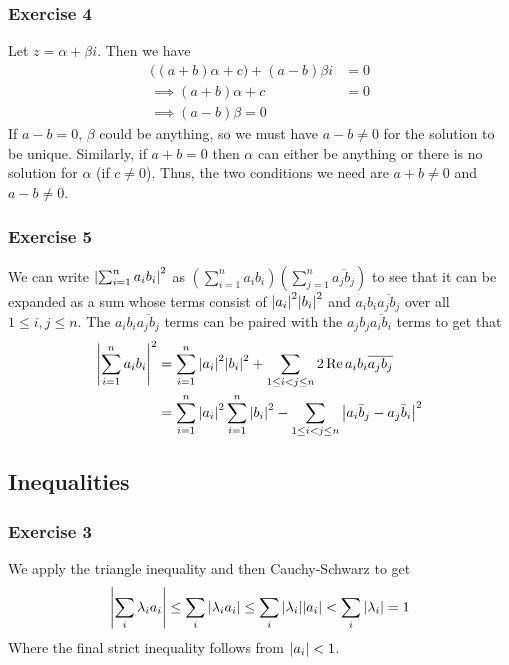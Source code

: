 \subsubsection{Exercise 4}
Let $z = \alpha + \beta i$. Then we have
\begin{align*}
        \big((a + b) \alpha + c\big) + (a - b)\beta i &= 0 \\
        \implies (a + b) \alpha + c &= 0 \\
        \implies (a - b) \beta = 0
\end{align*}
If $a - b = 0$, $\beta$ could be anything, so we must have $a - b \neq 0$ for the solution to be unique.
Similarly, if $a + b = 0$ then $\alpha$ can either be anything or there is no solution for $\alpha$ 
(if $c \neq 0$). Thus, the two conditions we need are  $a + b \neq 0$ and $a - b \neq 0$.

\subsubsection{Exercise 5}
We can write $\abs{\sum_{i = 1}^n a_i b_i}^2$ as $(\sum_{i = 1}^n a_i b_i) (\sum_{j = 1}^n \overline{a_j b_j})$
to see that it can be expanded as a sum whose terms consist of $\abs{a_i}^2 \abs{b_i}^2$ and 
$a_i b_i \overline{a_j b_j}$ over all $1 \leq i, j \leq n$. The $a_i b_i \overline{a_j b_j}$ terms can be
paired with the $a_j b_j \overline{a_i b_i}$ terms to get that
\begin{align*}
        \abs{\sum_{i = 1}^n a_i b_i}^2 &= \sum_{i = 1}^n \abs{a_i}^2 \abs{b_i}^2 + \sum_{1 \leq i < j \leq n} 2 \Re a_i b_i \overline{a_j b_j} \\
                                       &= \sum_{i = 1}^n \abs{a_i}^2 \sum_{i = 1}^n \abs{b_i}^2 - \sum_{1 \leq i < j \leq n} \abs{a_i \bar{b}_j - a_j \bar{b}_i}^2
\end{align*}

\subsection{Inequalities}

\subsubsection{Exercise 3}
We apply the triangle inequality and then Cauchy-Schwarz to get
\begin{align*}
        \abs{\sum_{i} \lambda_i a_i} \leq \sum_{i} \abs{\lambda_i a_i} \leq \sum_{i} \abs{\lambda_i} \abs{a_i} < \sum_{i} \abs{\lambda_i} = 1
\end{align*}
Where the final strict inequality follows from $\abs{a_i} < 1$.

